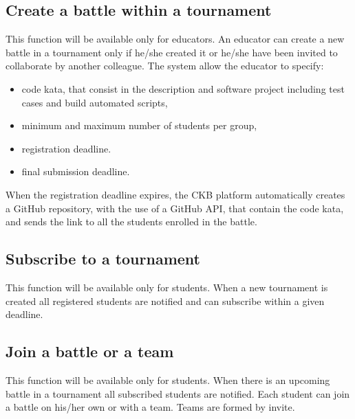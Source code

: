 \subsection{Create a battle within a tournament}
This function will be available only for educators. \newline An educator can create a new battle in a tournament only if he/she created it or he/she have been invited to collaborate by another colleague.
The system allow the educator to specify: 
\begin{itemize}
    \item code kata, that consist in the description and software project including test cases and build automated scripts,
    \item minimum and maximum number of students per group, 
    \item registration deadline.
    \item final submission deadline.
\end{itemize}
When the registration deadline expires, the CKB platform automatically creates a GitHub repository, with the use of a GitHub API, that contain the code kata, and sends the link to all the students enrolled in the battle.

\subsection{Subscribe to a tournament}
This function will be available only for students. \newline When a new tournament is created all registered students are notified and can subscribe within a given deadline.


\subsection{Join a battle or a team}
This function will be available only for students. \newline When there is an upcoming battle in a tournament all subscribed students are notified. Each student can join a battle on his/her own or with a team. Teams are formed by invite.

